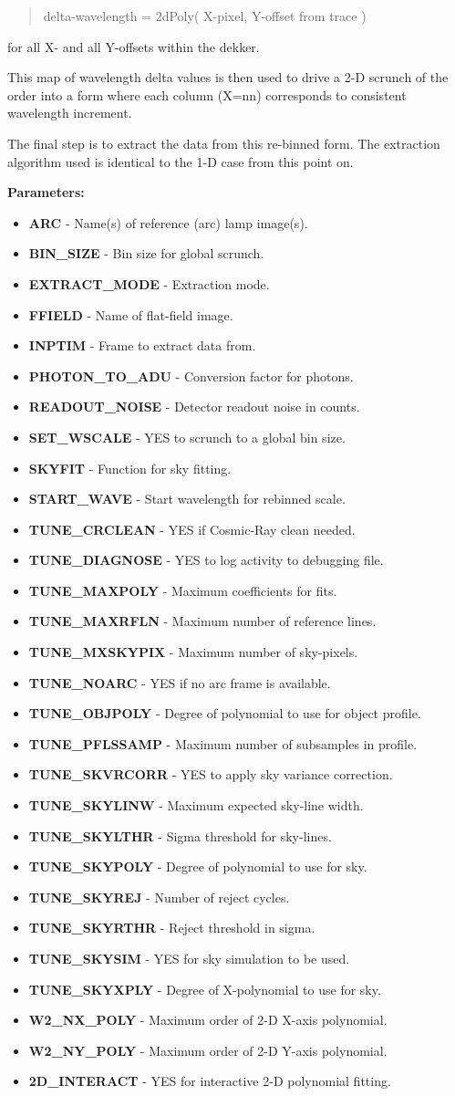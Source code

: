 \documentclass[11pt,twoside]{article}
\newcommand{\htmlref}[2]{#1}
\newcommand{\echpars}[1]{
{\bf Parameters:\vspace*{6pt}\\}
    #1
}
\renewcommand{\echpars}[1]{
{\bf Parameters:}
\begin{itemize}
#1
\end{itemize}
}
\newcommand{\epar}[3]
{
    \hspace*{5mm}\makebox[50mm][l]{\bf #1} #2 (p~\pageref{par_#3}.)\\
}
\renewcommand{\epar}[3]
{\item \htmlref{{\bf #1}}{par_#3} - #2}
\newcommand{\lepar}[3]
{
    \hspace*{5mm}\makebox[50mm][l]{\bf #1} #2 (p~\pageref{par_#3}.)
}
\renewcommand{\lepar}[3]
{\item \htmlref{{\bf #1}}{par_#3} - #2}
\begin{document}
\begin{quote}

   delta-wavelength = 2dPoly( X-pixel, Y-offset from trace )

\end{quote}

for all X- and all Y-offsets within the dekker.

This map of wavelength delta values is then used to drive a 2-D scrunch
of the order into a form where each column (X=nn) corresponds to
consistent wavelength increment.

The final step is to extract the data from this re-binned form. The
extraction algorithm used is identical to the 1-D case from this point on.

\echpars{
\epar{ARC}{Name(s) of reference (arc) lamp image(s).}{ARC}
\epar{BIN\_SIZE}{Bin size for global scrunch.}{BIN_SIZE}
\epar{EXTRACT\_MODE}{Extraction mode.}{EXTRACT_MODE}
\epar{FFIELD}{Name of flat-field image.}{FFIELD}
\epar{INPTIM}{Frame to extract data from.}{INPTIM}
\epar{PHOTON\_TO\_ADU}{Conversion factor for photons.}{PHOTON_TO_ADU}
\epar{READOUT\_NOISE}{Detector readout noise in counts.}{READOUT_NOISE}
\epar{SET\_WSCALE}{YES to scrunch to a global bin size.}{SET_WSCALE}
\epar{SKYFIT}{Function for sky fitting.}{SKYFIT}
\epar{START\_WAVE}{Start wavelength for rebinned scale.}{START_WAVE}
\epar{TUNE\_CRCLEAN}{YES if Cosmic-Ray clean needed.}{TUNE_CRCLEAN}
\epar{TUNE\_DIAGNOSE}{YES to log activity to debugging file.}{TUNE_DIAGNOSE}
\epar{TUNE\_MAXPOLY}{Maximum coefficients for fits.}{TUNE_MAXPOLY}
\epar{TUNE\_MAXRFLN}{Maximum number of reference lines.}{TUNE_MAXRFLN}
\epar{TUNE\_MXSKYPIX}{Maximum number of sky-pixels.}{TUNE_MXSKYPIX}
\epar{TUNE\_NOARC}{YES if no arc frame is available.}{TUNE_NOARC}
\epar{TUNE\_OBJPOLY}{Degree of polynomial to use for object profile.}{TUNE_OBJPOLY}
\epar{TUNE\_PFLSSAMP}{Maximum number of subsamples in profile.}{TUNE_PFLSSAMP}
\epar{TUNE\_SKVRCORR}{YES to apply sky variance correction.}{TUNE_SKVRCORR}
\epar{TUNE\_SKYLINW}{Maximum expected sky-line width.}{TUNE_SKYLINW}
\epar{TUNE\_SKYLTHR}{Sigma threshold for sky-lines.}{TUNE_SKYLTHR}
\epar{TUNE\_SKYPOLY}{Degree of polynomial to use for sky.}{TUNE_SKYPOLY}
\epar{TUNE\_SKYREJ}{Number of reject cycles.}{TUNE_SKYREJ}
\epar{TUNE\_SKYRTHR}{Reject threshold in sigma.}{TUNE_SKYRTHR}
\epar{TUNE\_SKYSIM}{YES for sky simulation to be used.}{TUNE_SKYSIM}
\epar{TUNE\_SKYXPLY}{Degree of X-polynomial to use for sky.}{TUNE_SKYXPLY}
\epar{W2\_NX\_POLY}{Maximum order of 2-D X-axis polynomial.}{W2_NX_POLY}
\epar{W2\_NY\_POLY}{Maximum order of 2-D Y-axis polynomial.}{W2_NY_POLY}
\lepar{2D\_INTERACT}{YES for interactive 2-D polynomial fitting.}{2D_INTERACT}
}
\end{document}
